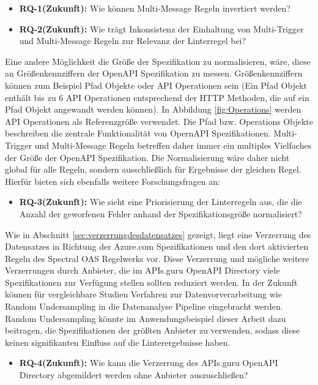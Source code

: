   \begin{itemize}
    \item \textbf{RQ-1(Zukunft):} Wie können Multi-Message Regeln invertiert werden?
    \item \textbf{RQ-2(Zukunft):} Wie trägt Inkonsistenz der Einhaltung von Multi-Trigger und Multi-Message Regeln zur Relevanz der Linterregel bei?
  \end{itemize}

  Eine andere Möglichkeit die Größe der Spezifikation zu normalisieren, wäre, diese an Größenkennziffern der OpenAPI Spezifikation zu messen. Größenkennziffern können zum Beispiel Pfad Objekte oder \acs{API} Operationen sein (Ein Pfad Objekt enthält bis zu 6 API Operationen entsprechend der \acs{HTTP} Methoden, die auf ein Pfad Objekt angewandt werden können). In Abbildung \ref{fig:Operations} werden \acs{API} Operationen als Referenzgröße verwendet. Die Pfad bzw. Operations Objekte beschreiben die zentrale Funktionalität von OpernAPI Spezifikationen. Multi-Trigger und Multi-Message Regeln betreffen daher immer ein multiples Vielfaches der Größe der OpenAPI Spezifikation. Die Normalisierung wäre daher nicht global für alle Regeln, sondern ausschließlich für Ergebnisse der gleichen Regel. Hierfür bieten sich ebenfalls weitere Forschungsfragen an:

  \begin{itemize}
    \item \textbf{RQ-3(Zukunft):} Wie sieht eine Priorisierung der Linterregeln aus, die die Anzahl der geworfenen Fehler anhand der Spezifikationsgröße normalisiert?
  \end{itemize}

  Wie in Abschnitt \ref{sec:verzerrungdesdatensatzes} gezeigt, liegt eine Verzerrung des Datensatzes in Richtung der Azure.com Spezifikationen und den dort aktivierten Regeln des Spectral \acs{OAS} Regelwerks vor. Diese Verzerrung und mögliche weitere Verzerrungen durch Anbieter, die im APIs.guru OpenAPI Directory viele Spezifikationen zur Verfügung stellen sollten reduziert werden. In der Zukunft können für vergleichbare Studien Verfahren zur Datenvorverarbeitung wie Random Undersampling \parencite{hasanin_effects_2018} in die Datenanalyse Pipeline eingebracht werden. Random Undersampling könnte im Anwendungsbeispiel dieser Arbeit dazu beitragen, die Spezifikationen der größten Anbieter zu verwenden, sodass diese keinen signifikanten Einfluss auf die Linterergebnisse haben. 

  \begin{itemize}
    \item \textbf{RQ-4(Zukunft):} Wie kann die Verzerrung des APIs.guru OpenAPI Directory abgemildert werden ohne Anbieter auszuschließen?
  \end{itemize}

